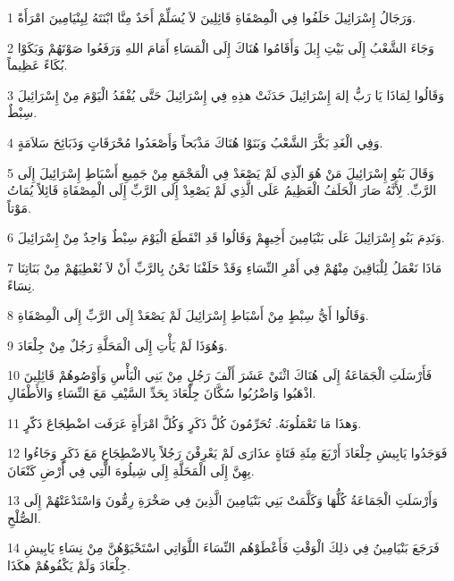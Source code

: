 \par 1 وَرَجَالُ إِسْرَائِيلَ حَلَفُوا فِي الْمِصْفَاةِ قَائِلِينَ لاَ يُسَلِّمْ أَحَدٌ مِنَّا ابْنَتَهُ لِبِنْيَامِينَ امْرَأَةً.
\par 2 وَجَاءَ الشَّعْبُ إِلَى بَيْتِ إِيلَ وَأَقَامُوا هُنَاكَ إِلَى الْمَسَاءِ أَمَامَ اللهِ وَرَفَعُوا صَوْتَهُمْ وَبَكَوْا بُكَاءً عَظِيماً.
\par 3 وَقَالُوا لِمَاذَا يَا رَبُّ إلهَ إِسْرَائِيلَ حَدَثَتْ هذِهِ فِي إِسْرَائِيلَ حَتَّى يُفْقَدُ الْيَوْمَ مِنْ إِسْرَائِيلَ سِبْطٌ.
\par 4 وَفِي الْغَدِ بَكَّرَ الشَّعْبُ وَبَنَوْا هُنَاكَ مَذْبَحاً وَأَصْعَدُوا مُحْرَقَاتٍ وَذَبَائِحَ سَلاَمَةٍ.
\par 5 وَقَالَ بَنُو إِسْرَائِيلَ مَنْ هُوَ الّذِي لَمْ يَصْعَدْ فِي الْمَجْمَعِ مِنْ جَمِيعِ أَسْبَاطِ إِسْرَائِيلَ إِلَى الرَّبِّ. لِأَنَّهُ صَارَ الْحَلَفُ الْعَظِيمُ عَلَى الَّذِي لَمْ يَصْعِدْ إِلَى الرَّبِّ إِلَى الْمِصْفَاةِ قَائِلاً يُمَاتُ مَوْتاً.
\par 6 وَنَدِمَ بَنُو إِسْرَائِيلَ عَلَى بَنْيَامِينَ أَخِيهِمْ وَقَالُوا قَدِ انْقَطَعَ الْيَوْمَ سِبْطٌ وَاحِدٌ مِنْ إِسْرَائِيلَ.
\par 7 مَاذَا نَعْمَلُ لِلْبَاقِينَ مِنْهُمْ فِي أَمْرِ النِّسَاءِ وَقَدْ حَلَفْنَا نَحْنُ بِالرَّبِّ أَنْ لاَ نُعْطِيَهُمْ مِنْ بَنَاتِنَا نِسَاءً.
\par 8 وَقَالُوا أَيُّ سِبْطٍ مِنْ أَسْبَاطِ إِسْرَائِيلَ لَمْ يَصْعَدْ إِلَى الرَّبِّ إِلَى الْمِصْفَاةِ.
\par 9 وَهُوَذَا لَمْ يَأْتِ إِلَى الْمَحَلَّةِ رَجُلٌ مِنْ جِلْعَادَ.
\par 10 فَأَرْسَلَتِ الْجَمَاعَةُ إِلَى هُنَاكَ اثْنَيْ عَشَرَ أَلْفَ رَجُلٍ مِنْ بَنِي الْبَأْسِ وَأَوْصُوهُمْ قَائِلِينَ اذْهَبُوا وَاضْرُبُوا سُكَّانَ جِلْعَادَ بِحَدِّ السَّيْفِ مَعَ النِّسَاءِ وَالأَطْفَالِ.
\par 11 وَهذَا مَا تَعْمَلُونَهُ. تُحَرِّمُونَ كُلَّ ذَكَرٍ وَكُلَّ امْرَأَةٍ عَرَفَت اضْطِجَاعَ ذَكّرٍ.
\par 12 فَوَجَدُوا يَابِيشِ جِلْعَادَ أَرْبَعَ مِئَةِ فَتَاةٍ عذَارَى لَمْ يَعْرِفْنَ رَجُلاً بِالاضْطِجَاعِ مَعَ ذَكَرٍ وَجَاءُوا بِهِنَّ إِلَى الْمَحَلَّةِ إِلَى شِيلُوهَ الَّتِي فِي أَرْضِ كَنْعَانَ.
\par 13 وَأَرْسَلَتِ الْجَمَاعَةُ كُلُّهَا وَكَلَّمَتْ بَنِي بَنْيَامِينَ الَّذِينَ فِي صَخْرَةِ رِمُّونَ وَاسْتَدْعَتْهُمْ إِلَى الصُّلْحِ.
\par 14 فَرَجَعَ بَنْيَامِينُ فِي ذلِكَ الْوَقْتِ فَأَعْطَوْهُم النِّسَاءَ اللَّوَاتِي اسْتَحْيَوْهُنَّ مِنْ نِسَاءِ يَابِيشِ جِلْعَادَ وَلَمْ يَكْفُوهُمْ هكَذَا.
